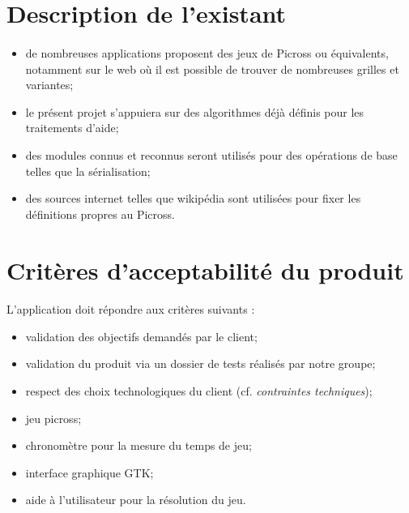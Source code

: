 \section{Description de l'existant}
        \paragraph*{}
        \begin{itemize}
                \item de nombreuses applications proposent des jeux de Picross ou équivalents, notamment sur le web où il est possible de trouver de nombreuses grilles et variantes;
                \item le présent projet s'appuiera sur des algorithmes déjà définis pour les traitements d'aide;
                \item des modules connus et reconnus seront utilisés pour des opérations de base telles que la sérialisation;
                \item des sources internet telles que wikipédia sont utilisées pour fixer les définitions propres au Picross.
        \end{itemize}


\section{Critères d'acceptabilité du produit}
        \paragraph*{}
        L'application doit répondre aux critères suivants :
        \begin{itemize}
          \item validation des objectifs demandés par le client;
                \item validation du produit via un dossier de tests réalisés par notre groupe;
                \item respect des choix technologiques du client (cf. \textit{contraintes techniques});
                \item jeu picross;
                \item chronomètre pour la mesure du temps de jeu;
                \item interface graphique GTK;
                \item aide à l'utilisateur pour la résolution du jeu.
        \end{itemize}




